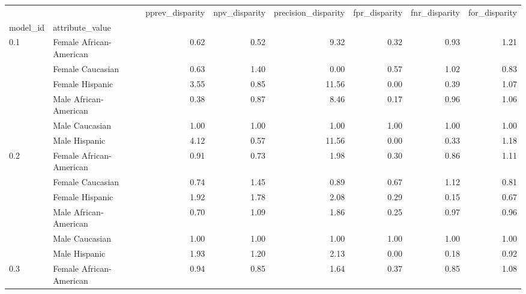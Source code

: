 \begin{tabular}{llrrrrrr}
\toprule
    &               &  pprev\_disparity &  npv\_disparity &  precision\_disparity &  fpr\_disparity &  fnr\_disparity &  for\_disparity \\
model\_id & attribute\_value &                  &                &                      &                &                &                \\
\midrule
0.1 & Female African-American &             0.62 &           0.52 &                 9.32 &           0.32 &           0.93 &           1.21 \\
    & Female Caucasian &             0.63 &           1.40 &                 0.00 &           0.57 &           1.02 &           0.83 \\
    & Female Hispanic &             3.55 &           0.85 &                11.56 &           0.00 &           0.39 &           1.07 \\
    & Male African-American &             0.38 &           0.87 &                 8.46 &           0.17 &           0.96 &           1.06 \\
    & Male Caucasian &             1.00 &           1.00 &                 1.00 &           1.00 &           1.00 &           1.00 \\
    & Male Hispanic &             4.12 &           0.57 &                11.56 &           0.00 &           0.33 &           1.18 \\
0.2 & Female African-American &             0.91 &           0.73 &                 1.98 &           0.30 &           0.86 &           1.11 \\
    & Female Caucasian &             0.74 &           1.45 &                 0.89 &           0.67 &           1.12 &           0.81 \\
    & Female Hispanic &             1.92 &           1.78 &                 2.08 &           0.29 &           0.15 &           0.67 \\
    & Male African-American &             0.70 &           1.09 &                 1.86 &           0.25 &           0.97 &           0.96 \\
    & Male Caucasian &             1.00 &           1.00 &                 1.00 &           1.00 &           1.00 &           1.00 \\
    & Male Hispanic &             1.93 &           1.20 &                 2.13 &           0.00 &           0.18 &           0.92 \\
0.3 & Female African-American &             0.94 &           0.85 &                 1.64 &           0.37 &           0.85 &           1.08 \\

\end{tabular}
